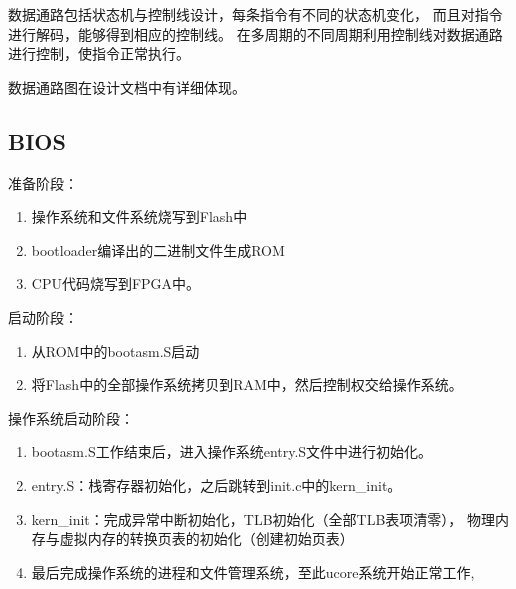             数据通路包括状态机与控制线设计，每条指令有不同的状态机变化，
            而且对指令进行解码，能够得到相应的控制线。%
            在多周期的不同周期利用控制线对数据通路进行控制，使指令正常执行。
            
            数据通路图在设计文档中有详细体现。

            
    \subsection{BIOS}
        准备阶段：
        \begin{enumerate}
            \item
                操作系统和文件系统烧写到Flash中%
            \item
                bootloader编译出的二进制文件生成ROM
            \item
                CPU代码烧写到FPGA中。
        \end{enumerate}

        启动阶段：
        \begin{enumerate}
            \item
                从ROM中的bootasm.S启动
            \item
                将Flash中的全部操作系统拷贝到RAM中，然后控制权交给操作系统。
        \end{enumerate}

        操作系统启动阶段：
        \begin{enumerate}
            \item
                bootasm.S工作结束后，进入操作系统entry.S文件中进行初始化。
            \item
                entry.S：栈寄存器初始化，之后跳转到init.c中的kern\_init。
            \item
                kern\_init：完成异常中断初始化，TLB初始化（全部TLB表项清零），%
                物理内存与虚拟内存的转换页表的初始化（创建初始页表）
            \item
                最后完成操作系统的进程和文件管理系统，至此ucore系统开始正常工作,
        \end{enumerate}
        

